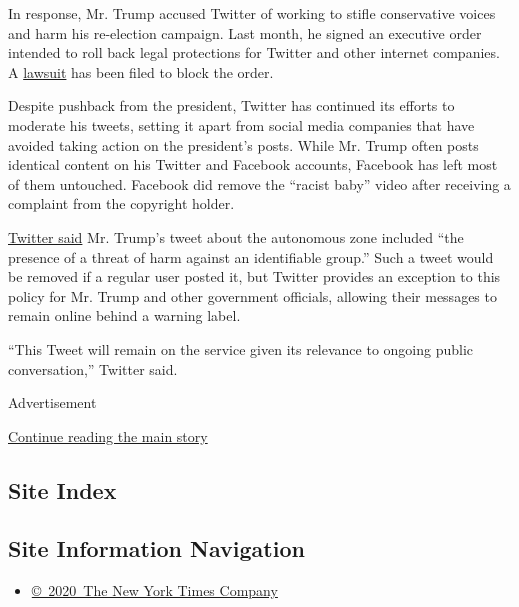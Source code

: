 In response, Mr. Trump accused Twitter of working to stifle conservative
voices and harm his re-election campaign. Last month, he signed an
executive order intended to roll back legal protections for Twitter and
other internet companies. A
\href{https://www.nytimes.com/2020/06/02/technology/trump-twitter-free-speech-lawsuit.html}{lawsuit}
has been filed to block the order.

Despite pushback from the president, Twitter has continued its efforts
to moderate his tweets, setting it apart from social media companies
that have avoided taking action on the president's posts. While Mr.
Trump often posts identical content on his Twitter and Facebook
accounts, Facebook has left most of them untouched. Facebook did remove
the ``racist baby'' video after receiving a complaint from the copyright
holder.

\href{https://twitter.com/TwitterSafety/status/1275500569940176897}{Twitter
said} Mr. Trump's tweet about the autonomous zone included ``the
presence of a threat of harm against an identifiable group.'' Such a
tweet would be removed if a regular user posted it, but Twitter provides
an exception to this policy for Mr. Trump and other government
officials, allowing their messages to remain online behind a warning
label.

``This Tweet will remain on the service given its relevance to ongoing
public conversation,'' Twitter said.

Advertisement

\protect\hyperlink{after-bottom}{Continue reading the main story}

\hypertarget{site-index}{%
\subsection{Site Index}\label{site-index}}

\hypertarget{site-information-navigation}{%
\subsection{Site Information
Navigation}\label{site-information-navigation}}

\begin{itemize}
\tightlist
\item
  \href{https://help.nytimes.com/hc/en-us/articles/115014792127-Copyright-notice}{©~2020~The
  New York Times Company}
\end{itemize}

